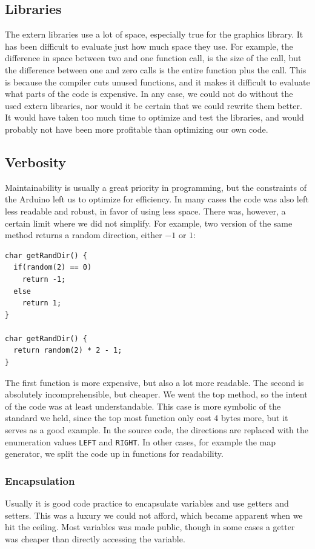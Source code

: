 \subsection{Libraries} %
The extern libraries use a lot of space, especially true for the graphics library. It has been difficult to evaluate just how much space they use. For example, the difference in space between two and one function call, is the size of the call, but the difference between one and zero calls is the entire function plus the call. This is because the compiler cuts unused functions, and it makes it difficult to evaluate what parts of the code is expensive.
\newline
In any case, we could not do without the used extern libraries, nor would it be certain that we could rewrite them better. It would have taken too much time to optimize and test the libraries, and would probably not have been more profitable than optimizing our own code.

\subsection{Verbosity} %
Maintainability is usually a great priority in programming, but the constraints of the Arduino left us to optimize for efficiency. In many cases the code was also left less readable and robust, in favor of using less space. There was, however, a certain limit where we did not simplify. For example, two version of the same method returns a random direction, either $-1$ or $1$:
\begin{verbatim}
char getRandDir() {
  if(random(2) == 0)
    return -1;
  else
    return 1;
}

char getRandDir() {
  return random(2) * 2 - 1;
}
\end{verbatim}
The first function is more expensive, but also a lot more readable. The second is absolutely incomprehensible, but cheaper. We went the top method, so the intent of the code was at least understandable. This case is more symbolic of the standard we held, since the top most function only cost 4 bytes more, but it serves as a good example. In the source code, the directions are replaced with the enumeration values {\tt LEFT} and {\tt RIGHT}. In other cases, for example the map generator, we split the code up in functions for readability.

\subsubsection{Encapsulation} %
Usually it is good code practice to encapsulate variables and use getters and setters. This was a luxury we could not afford, which became apparent when we hit the ceiling. Most variables was made public, though in some cases a getter was cheaper than directly accessing the variable.

